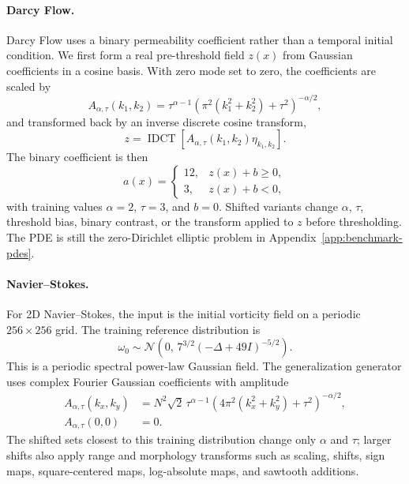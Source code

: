 ﻿\documentclass[letterpaper]{article} %
\newcommand{\appref}[1]{Appendix~\ref{#1}}
\begin{document}
\paragraph{Darcy Flow.}
Darcy Flow uses a binary permeability coefficient rather than a temporal
initial condition. We first form a real pre-threshold field $z(x)$ from
Gaussian coefficients in a cosine basis. With zero mode set to zero, the
coefficients are scaled by
\begin{equation}
  A_{\alpha,\tau}(k_1,k_2)
  =
  \tau^{\alpha-1}
  \left(
    \pi^2(k_1^2+k_2^2)+\tau^2
  \right)^{-\alpha/2},
\end{equation}
and transformed back by an inverse discrete cosine transform,
\begin{equation}
  z
  =
  \operatorname{IDCT}
  \left[
    A_{\alpha,\tau}(k_1,k_2)\eta_{k_1,k_2}
  \right].
\end{equation}
The binary coefficient is then
\begin{equation}
  a(x)=
  \begin{cases}
    12, & z(x)+b\ge 0,\\
    3, & z(x)+b<0,
  \end{cases}
\end{equation}
with training values $\alpha=2$, $\tau=3$, and $b=0$. Shifted variants change
$\alpha$, $\tau$, threshold bias, binary contrast, or the transform applied to
$z$ before thresholding. The PDE is still the zero-Dirichlet elliptic problem in
\appref{app:benchmark-pdes}.

\paragraph{Navier--Stokes.}
For 2D Navier--Stokes, the input is the initial vorticity field on
a periodic $256\times256$ grid. The training reference distribution is
\begin{equation}
  \omega_0
  \sim
  \mathcal N
  \left(
    0,\,
    7^{3/2}(-\Delta+49I)^{-5/2}
  \right).
\end{equation}
This is a periodic spectral power-law Gaussian field. The generalization generator uses
complex Fourier Gaussian coefficients with amplitude
\begin{align}
  A_{\alpha,\tau}(k_x,k_y)
  &=
  N^2\sqrt{2}\,
  \tau^{\alpha-1}
  \left(
    4\pi^2(k_x^2+k_y^2)+\tau^2
  \right)^{-\alpha/2},
  \nonumber\\
  A_{\alpha,\tau}(0,0)
  &=0 .
\end{align}
The shifted sets closest to this training distribution change only $\alpha$ and
$\tau$; larger shifts also apply range and morphology transforms such as scaling,
shifts, sign maps, square-centered maps, log-absolute maps, and sawtooth
additions.
\end{document}
